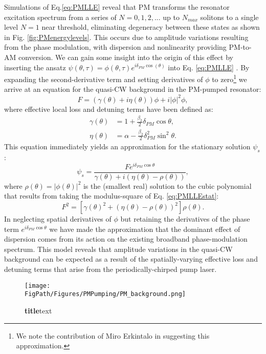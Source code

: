 Simulations of Eq.\ref{eq:PMLLE} reveal that PM transforms the resonator excitation spectrum from a series of $N=0, 1, 2,...$ up to $N_{max}$ solitons to a single level $N=1$ near threshold, eliminating degeneracy between these states as shown in Fig. \ref{fig:PMenergylevels}. This occurs due to amplitude variations resulting from the phase modulation, with dispersion and nonlinearity providing PM-to-AM conversion. We can gain some insight into the origin of this effect by inserting the ansatz $\psi(\theta,\tau)=\phi(\theta,\tau)e^{i\delta_{PM}\cos(\theta)}$ into Eq. \ref{eq:PMLLE} \cite{Jang2015a}.  By expanding the second-derivative term and setting derivatives of $\phi$ to zero\footnote{We note the contribution of Miro Erkintalo in suggesting this approximation.} we arrive at an equation for the quasi-CW background in the PM-pumped resonator:
\begin{equation}
F=\left(\gamma(\theta)+i\eta(\theta)\right)\phi+i|\phi|^2\phi, \label{eq:PMLLEstat}
\end{equation}
where effective local loss and detuning terms have been defined as:
\begin{align}
\gamma(\theta)&=1+\frac{\beta_2}{2}\delta_{PM}\cos{\theta},\\
\eta(\theta)&=\alpha-\frac{\beta_2}{2}\delta_{PM}^2\sin^2{\theta}.
\end{align}
This equation immediately yields an approximation for the stationary solution $\psi_s$:
\begin{equation}
\psi_s=\frac{Fe^{i\delta_{PM}\cos{\theta}}}{\gamma(\theta)+i\left(\eta(\theta)-\rho(\theta)\right)},
\end{equation}
where $\rho(\theta)=|\phi(\theta)|^2$ is the (smallest real) solution to the cubic polynomial that results from taking the modulus-square of Eq. \ref{eq:PMLLEstat}:
\begin{equation}
F^2=\left[\gamma(\theta)^2+\left(\eta(\theta)-\rho(\theta)\right)^2\right]\rho(\theta).
\end{equation}
In neglecting spatial derivatives of $\phi$ but retaining the derivatives of the phase term $e^{i\delta_{PM}\cos{\theta}}$ we have made the approximation that the dominant effect of dispersion comes from its action on the existing broadband phase-modulation spectrum. This model reveals that amplitude variations in the quasi-CW background can be expected as a result of the spatially-varying effective loss and detuning terms that arise from the periodically-chirped pump laser.

\begin{figure}[htpb]
	\begin{center}
		\texttt{[image: \\FigPath/Figures/PMPumping/PM\_background.png]}
	\end{center}
	\caption[Figure Title]{\textbf{title}text}
	\label{fig:PMbackground}
\end{figure} 

